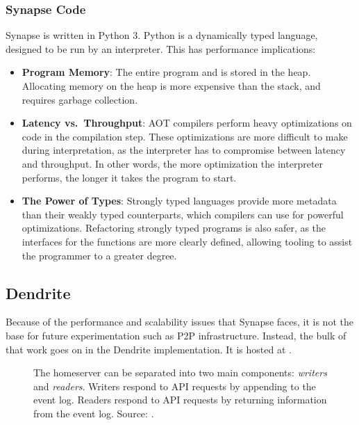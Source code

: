 \subsubsection{Synapse Code}
Synapse is written in Python 3.
Python is a dynamically typed language, designed to be run by an interpreter.
This has performance implications:
\begin{itemize}
      \item{
            \textbf{Program Memory}:
            The entire program and is stored in the heap.
            Allocating memory on the heap is more expensive than the stack, and requires garbage collection.
            }
      \item{
            \textbf{Latency vs.~Throughput}:
            \ac{AOT} compilers perform heavy optimizations on code in the compilation step.
            These optimizations are more difficult to make during interpretation, as the interpreter has to compromise between latency and throughput.
            In other words, the more optimization the interpreter performs, the longer it takes the program to start.
            }
      \item{
            \textbf{The Power of Types}:
            Strongly typed languages provide more metadata than their weakly typed counterparts, which compilers can use for powerful optimizations.
            Refactoring strongly typed programs is also safer, as the interfaces for the functions are more clearly defined, allowing tooling to assist the programmer to a greater degree.
            }
\end{itemize}

\subsection{Dendrite}
Because of the performance and scalability issues that Synapse faces, it is not the base for future experimentation such as \ac{P2P} infrastructure.
Instead, the bulk of that work goes on in the Dendrite implementation.
It is hosted at .

\begin{figure}
      \centering
      \resizebox{0.9\linewidth}{!}{}
      \caption{
            The homeserver can be separated into two main components: \textit{writers} and \textit{readers}.
            Writers respond to API requests by appending to the event log.
            Readers respond to API requests by returning information from the event log.
            Source: \cite{dendrite_design_md}.
      }
      \label{fig:dendrite_design}
\end{figure}

